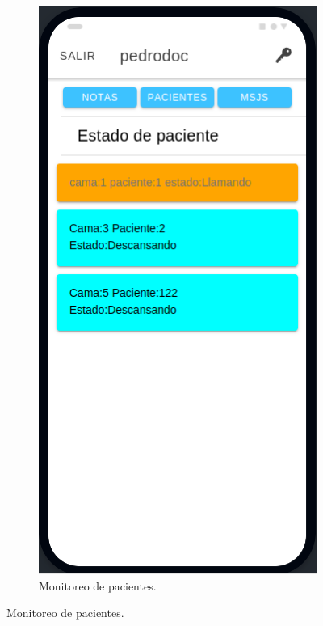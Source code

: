 \begin{figure}[!htpb]
     \centering
     \begin{subfigure}[b]{0.3\textwidth}
         \centering
         \includegraphics[width=.95\textwidth]{./Figures/app/doctor-patient-1.png}
         \caption{Monitoreo de pacientes.}
         \label{fig_1:1de3}

\end{subfigure}
\end{figure}

